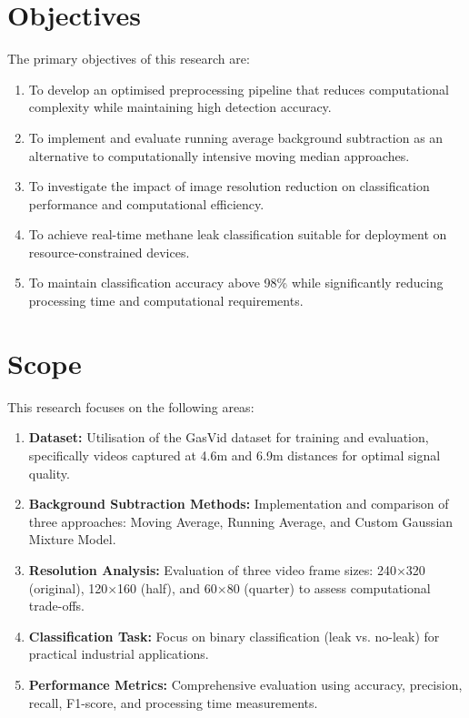 \section{Objectives}

The primary objectives of this research are:

\begin{enumerate}
\item To develop an optimised preprocessing pipeline that reduces computational complexity while maintaining high detection accuracy.

\item To implement and evaluate running average background subtraction as an alternative to computationally intensive moving median approaches.

\item To investigate the impact of image resolution reduction on classification performance and computational efficiency.

\item To achieve real-time methane leak classification suitable for deployment on resource-constrained devices.

\item To maintain classification accuracy above 98\% while significantly reducing processing time and computational requirements.
\end{enumerate}

\section{Scope}

This research focuses on the following areas:

\begin{enumerate}
\item \textbf{Dataset:} Utilisation of the GasVid dataset for training and evaluation, specifically videos captured at 4.6m and 6.9m distances for optimal signal quality.

\item \textbf{Background Subtraction Methods:} Implementation and comparison of three approaches: Moving Average, Running Average, and Custom Gaussian Mixture Model.

\item \textbf{Resolution Analysis:} Evaluation of three video frame sizes: 240×320 (original), 120×160 (half), and 60×80 (quarter) to assess computational trade-offs.

\item \textbf{Classification Task:} Focus on binary classification (leak vs. no-leak) for practical industrial applications.

\item \textbf{Performance Metrics:} Comprehensive evaluation using accuracy, precision, recall, F1-score, and processing time measurements.
\end{enumerate}

